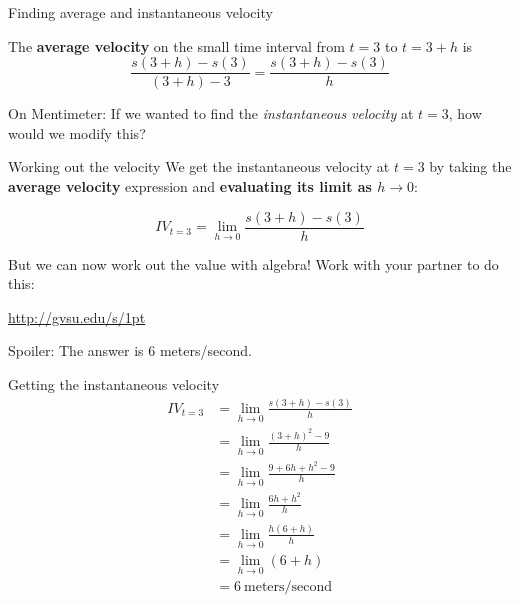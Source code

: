 \documentclass[10pt]{beamer}
\begin{document}
\begin{frame}{Finding average and instantaneous velocity}

The \textbf{average velocity} on the small time interval from $t=3$ to $t=3+h$ is
\begin{equation*}
    \frac{s(3+h)-s(3)}{(3+h)-3} = \frac{s(3+h) - s(3)}{h}
\end{equation*}

On Mentimeter: If we wanted to find the \textit{instantaneous velocity} at $t=3$, how would we modify this? 
    
\end{frame}

\begin{frame}{Working out the velocity}
    We get the instantaneous velocity at $t=3$ by taking the \textbf{average velocity} expression and \textbf{evaluating its limit as $h \to 0$}: 
    
    \begin{equation*}
        IV_{t=3} = \lim_{h \to 0} \frac{s(3+h) - s(3)}{h}
    \end{equation*}
    
But we can now work out the value with algebra! Work with your partner to do this: 
    \begin{center}
        \url{http://gvsu.edu/s/1pt}
    \end{center}

Spoiler: The answer is 6 meters/second. 
\end{frame}

\begin{frame}{Getting the instantaneous velocity}
\begin{align*}
    IV_{t=3} &= \lim_{h \to 0} \frac{s(3+h) - s(3)}{h} \\
    &= \lim_{h \to 0} \frac{(3+h)^2 - 9}{h} \\
    &= \lim_{h \to 0} \frac{9 + 6h + h^2 - 9}{h} \\
    &= \lim_{h \to 0} \frac{6h + h^2}{h} \\
    &= \lim_{h \to 0} \frac{h(6 + h)}{h} \\
    &= \lim_{h \to 0} (6+h) \\
    &= 6 \ \text{meters/second}
\end{align*}

\end{frame}
\end{document}
